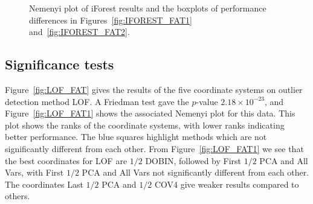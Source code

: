 \documentclass[letter,12pt]{article}
\begin{document}
\begin{figure}[!p]
  \centering
  \hfill
  \caption{Nemenyi plot of iForest results and the boxplots of performance differences in Figures~\ref{fig:IFOREST_FAT1} and~\ref{fig:IFOREST_FAT2}.}
  \label{fig:IFOREST_FAT}
\end{figure}

\subsection{Significance tests}\label{sec:DatRepo1}

Figure~\ref{fig:LOF_FAT} gives the results of the {\color{blue} five } coordinate systems on outlier detection method LOF. A Friedman test gave the $p$-value $ 2.18 \times 10^{-23}$, and Figure~\ref{fig:LOF_FAT1} shows the associated Nemenyi plot for this data. This plot shows the ranks of the coordinate systems, with lower ranks indicating better performance. The blue squares highlight methods which are not significantly different from each other. From Figure~\ref{fig:LOF_FAT1} we see that the best coordinates for LOF are $1/2$ DOBIN, followed by First $1/2$ PCA and All Vars, with  First $1/2$ PCA and All Vars not significantly different from each other. {\color{blue} The coordinates Last $1/2$ PCA and $1/2$ COV4 give weaker results compared to others.  }
\end{document}
